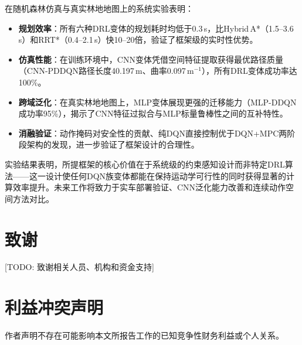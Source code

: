 \documentclass[twocolumn]{elsarticle}
\begin{document}
在随机森林仿真与真实林地地图上的系统实验表明：

\begin{itemize}
  \item \textbf{规划效率}：所有六种DRL变体的规划耗时均低于0.3\,s，比Hybrid\,A*（1.5--3.6\,s）和RRT*（0.4--2.1\,s）快10--20倍，验证了框架级的实时性优势。
  \item \textbf{仿真性能}：在训练环境中，CNN变体凭借空间特征提取获得最优路径质量（CNN-PDDQN路径长度40.197\,m、曲率0.097\,m$^{-1}$），所有DRL变体成功率达100\%。
  \item \textbf{跨域泛化}：在真实林地地图上，MLP变体展现更强的迁移能力（MLP-DDQN成功率95\%），揭示了CNN特征过拟合与MLP标量鲁棒性之间的互补特性。
  \item \textbf{消融验证}：动作掩码对安全性的贡献、纯DQN直接控制优于DQN+MPC两阶段架构的发现，进一步验证了框架设计的合理性。
\end{itemize}

实验结果表明，所提框架的核心价值在于系统级的约束感知设计而非特定DRL算法——这一设计使任何DQN族变体都能在保持运动学可行性的同时获得显著的计算效率提升。未来工作将致力于实车部署验证、CNN泛化能力改善和连续动作空间方法对比。

\section*{致谢}

[TODO: 致谢相关人员、机构和资金支持]

\section*{利益冲突声明}

作者声明不存在可能影响本文所报告工作的已知竞争性财务利益或个人关系。



\end{document}
